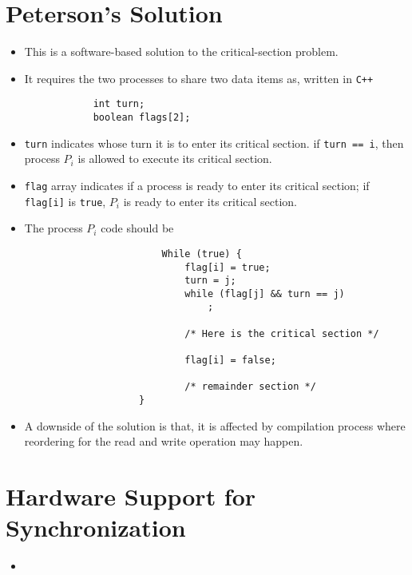 \documentclass{report}
\def\code#1{\texttt{#1}}
\begin{document}
\section{Peterson's Solution}%

\begin{itemize}
	\item This is a software-based solution to the critical-section problem.
	\item It requires the two processes to share two data items as, written in \code{C++}
	      \begin{verbatim}
            int turn;
            boolean flags[2];
\end{verbatim}
	\item \code{turn} indicates whose turn it is to enter its critical section.
	      if \code{turn == i}, then process $ P_{i} $ is allowed to execute its critical section.
	\item \code{flag} array indicates if a process is ready to enter its critical section;
	      if \code{flag[i]} is \code{true}, $ P_i $ is ready to enter its critical section.
	\item The process $ P_i $	code should be
	      \begin{verbatim}
						While (true) {
							flag[i] = true;
							turn = j;
							while (flag[j] && turn == j)
								;

							/* Here is the critical section */

							flag[i] = false;

							/* remainder section */
					}
				\end{verbatim}
  \item A downside of the solution is that, it is affected by compilation process where reordering
				for the read and write operation may happen.
\end{itemize}

\section{Hardware Support for Synchronization}%

\begin{itemize}
  \item
\end{itemize}
\end{document}
